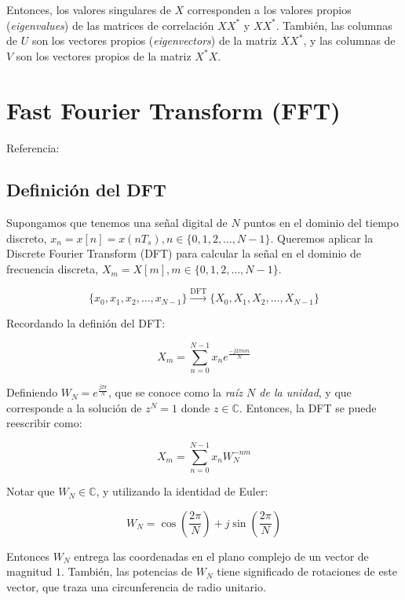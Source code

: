 Entonces, los valores singulares de $X$ corresponden a los valores propios (\emph{eigenvalues}) de las matrices de correlación $X X^*$ y $X X^*$. También, las columnas de $U$ son los vectores propios (\emph{eigenvectors}) de la matriz $X X^*$, y las columnas de $V$ son los vectores propios de la matriz $X^* X$.

\section{Fast Fourier Transform (FFT)}\label{s:FFT}

Referencia: \textcite[Cap. 2]{brunton_data-driven_2019}

\subsection{Definición del DFT}

Supongamos que tenemos una señal digital de $N$ puntos en el dominio del tiempo discreto, $x_n = x[n] = x(n T_s), n \in \{0,1,2,\ldots,N-1\}$. Queremos aplicar la Discrete Fourier Transform (DFT) para calcular la señal en el dominio de frecuencia discreta, $X_m = X[m], m \in \{0,1,2,\ldots,N-1\}$.

$$ \{x_0,x_1,x_2,\ldots,x_{N-1}\} \xrightarrow{\text{DFT}} \{X_0,X_1,X_2,\ldots,X_{N-1}\}$$

Recordando la definión del DFT:

\begin{equation}
    X_m = \sum_{n=0}^{N-1} x_n e^{\frac{-j2\pi n m}{N}}
\end{equation}

Definiendo $W_N = e^{\frac{j2\pi}{N}}$, que se conoce como la \emph{raíz $N$ de la unidad}, y que corresponde a la solución de $z^N = 1$ donde $z \in \mathbb{C}$. Entonces, la DFT se puede reescribir como:

\begin{equation}
    X_m = \sum_{n=0}^{N-1} x_n W_N^{-n m}
\end{equation}

Notar que $W_N \in \mathbb{C}$, y utilizando la identidad de Euler:

\begin{equation}
    W_N = \cos\left(\frac{2\pi}{N}\right) + j \sin\left(\frac{2\pi}{N}\right)
\end{equation}

Entonces $W_N$ entrega las coordenadas en el plano complejo de un vector de magnitud $1$. También, las potencias de $W_N$ tiene significado de rotaciones de este vector, que traza una circunferencia de radio unitario.

